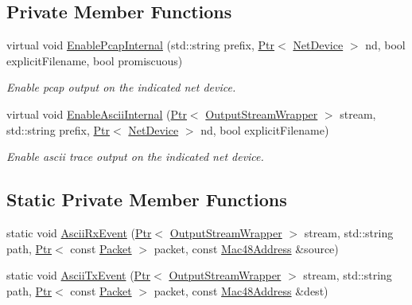 \subsection*{Private Member Functions}
\begin{DoxyCompactItemize}
\item 
virtual void \hyperlink{classns3_1_1WimaxHelper_ac7ed63d9f88a3247be0ec795ab8d8524}{Enable\+Pcap\+Internal} (std\+::string prefix, \hyperlink{classns3_1_1Ptr}{Ptr}$<$ \hyperlink{classns3_1_1NetDevice}{Net\+Device} $>$ nd, bool explicit\+Filename, bool promiscuous)
\begin{DoxyCompactList}\small\item\em Enable pcap output on the indicated net device. \end{DoxyCompactList}\item 
virtual void \hyperlink{classns3_1_1WimaxHelper_a17c3c18e993e68328621e3a36d5cc350}{Enable\+Ascii\+Internal} (\hyperlink{classns3_1_1Ptr}{Ptr}$<$ \hyperlink{classns3_1_1OutputStreamWrapper}{Output\+Stream\+Wrapper} $>$ stream, std\+::string prefix, \hyperlink{classns3_1_1Ptr}{Ptr}$<$ \hyperlink{classns3_1_1NetDevice}{Net\+Device} $>$ nd, bool explicit\+Filename)
\begin{DoxyCompactList}\small\item\em Enable ascii trace output on the indicated net device. \end{DoxyCompactList}\end{DoxyCompactItemize}
\subsection*{Static Private Member Functions}
\begin{DoxyCompactItemize}
\item 
static void \hyperlink{classns3_1_1WimaxHelper_ab6721a4324c77fd5c9501bfe62a1b29f}{Ascii\+Rx\+Event} (\hyperlink{classns3_1_1Ptr}{Ptr}$<$ \hyperlink{classns3_1_1OutputStreamWrapper}{Output\+Stream\+Wrapper} $>$ stream, std\+::string path, \hyperlink{classns3_1_1Ptr}{Ptr}$<$ const \hyperlink{classns3_1_1Packet}{Packet} $>$ packet, const \hyperlink{classns3_1_1Mac48Address}{Mac48\+Address} \&source)
\item 
static void \hyperlink{classns3_1_1WimaxHelper_a7fd62a344ec6c2018316a3be5e9d2646}{Ascii\+Tx\+Event} (\hyperlink{classns3_1_1Ptr}{Ptr}$<$ \hyperlink{classns3_1_1OutputStreamWrapper}{Output\+Stream\+Wrapper} $>$ stream, std\+::string path, \hyperlink{classns3_1_1Ptr}{Ptr}$<$ const \hyperlink{classns3_1_1Packet}{Packet} $>$ packet, const \hyperlink{classns3_1_1Mac48Address}{Mac48\+Address} \&dest)
\end{DoxyCompactItemize}

